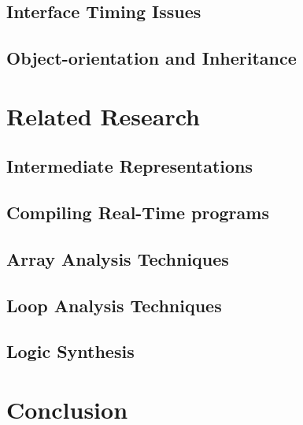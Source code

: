 \documentclass[10pt,notitlepage,twocolumn]{article}
\begin{document}
\subsection{Interface Timing Issues}
\subsection{Object-orientation and Inheritance}
\section{Related Research}
\subsection{Intermediate Representations}
\subsection{Compiling Real-Time programs}
\subsection{Array Analysis Techniques}
\subsection{Loop Analysis Techniques}
\subsection{Logic Synthesis}
\section{Conclusion}

\nocite{*}

\end{document}
